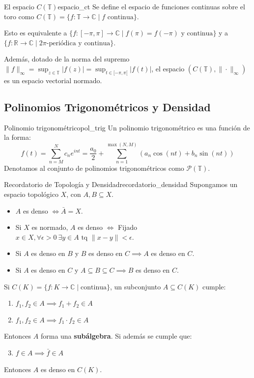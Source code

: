 \begin{definicion}{El espacio $C(\mathbb{T})$}{espacio_ct}
Se define el espacio de funciones continuas sobre el toro como $C(\mathbb{T}) = \{f:\mathbb{T} \to \mathbb{C} \mid f \text{ continua}\}$.

Esto es equivalente a $\{f:[-\pi,\pi] \to \mathbb{C} \mid f(\pi)=f(-\pi) \text{ y continua}\}$ y a $\{f:\mathbb{R} \to \mathbb{C} \mid 2\pi\text{-periódica y continua}\}$.

Además, dotado de la norma del supremo $\|f\|_\infty = \sup_{z \in \mathbb{T}} |f(z)| = \sup_{t \in [-\pi,\pi[} |f(t)|$, el espacio $(C(\mathbb{T}), \|\cdot\|_\infty)$ es un espacio vectorial normado.
\end{definicion}

\subsection{Polinomios Trigonométricos y Densidad}

\begin{definicion}{Polinomio trigonométrico}{pol_trig}
Un polinomio trigonométrico es una función de la forma:
\begin{equation*}
    f(t) = \sum_{n=M}^N c_n e^{int} = \frac{a_0}{2} + \sum_{n=1}^{\max(N,M)} (a_n \cos(nt) + b_n \sin(nt))
\end{equation*}
Denotamos al conjunto de polinomios trigonométricos como $\mathcal{P}(\mathbb{T})$.
\end{definicion}

\begin{observacion}{Recordatorio de Topología y Densidad}{recordatorio_densidad}
Supongamos un espacio topológico $X$, con $A, B \subseteq X$.
\begin{itemize}
    \item $A$ es denso $\iff \bar{A} = X$.
    \item Si $X$ es normado, $A$ es denso $\iff$ Fijado $x \in X, \forall \epsilon > 0 \ \exists y \in A \text{ tq } \|x - y\| < \epsilon$.
    \item Si $A$ es denso en $B$ y $B$ es denso en $C \implies A$ es denso en $C$.
    \item Si $A$ es denso en $C$ y $A \subseteq B \subseteq C \implies B$ es denso en $C$.
\end{itemize}

Si $C(K) = \{f: K \to \mathbb{C} \mid \text{continua}\}$, un subconjunto $A \subseteq C(K)$ cumple:
\begin{enumerate}
    \item $f_1, f_2 \in A \implies f_1 + f_2 \in A$
    \item $f_1, f_2 \in A \implies f_1 \cdot f_2 \in A$
\end{enumerate}
Entonces $A$ forma una \textbf{subálgebra}. Si además se cumple que:
\begin{enumerate}
    \setcounter{enumi}{2}
    \item $f \in A \implies \bar{f} \in A$
\end{enumerate}
Entonces $A$ es denso en $C(K)$.
\end{observacion}

